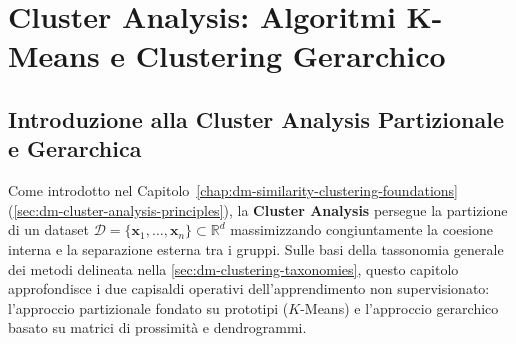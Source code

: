 \chapter{Cluster Analysis: Algoritmi K-Means e Clustering Gerarchico}
\label{chap:dm-kmeans-hierarchical}

\section{Introduzione alla Cluster Analysis Partizionale e Gerarchica}
\label{sec:dm-clustering-intro-taxonomy}

Come introdotto nel Capitolo~\ref{chap:dm-similarity-clustering-foundations} (\autoref{sec:dm-cluster-analysis-principles}), la \textbf{Cluster Analysis} persegue la partizione di un dataset $\mathcal{D} = \{\mathbf{x}_1, \dots, \mathbf{x}_n\} \subset \mathbb{R}^d$ massimizzando congiuntamente la coesione interna e la separazione esterna tra i gruppi. Sulle basi della tassonomia generale dei metodi delineata nella \autoref{sec:dm-clustering-taxonomies}, questo capitolo approfondisce i due capisaldi operativi dell'apprendimento non supervisionato: l'approccio partizionale fondato su prototipi ($K$-Means) e l'approccio gerarchico basato su matrici di prossimità e dendrogrammi.

